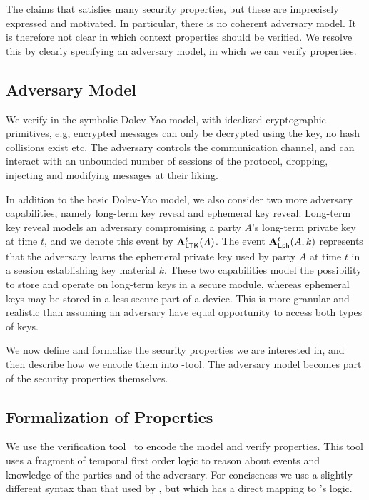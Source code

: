 The \mEdhoc{} \mSpec{} \cite{our-analysis-selander-lake-edhoc-00} claims
that \mEdhoc{} satisfies many security properties, but these are imprecisely
expressed and motivated.
%
In particular, there is no coherent adversary model.
%
It is therefore not clear in which context properties should be verified.
%
We resolve this by clearly specifying an adversary model, in which we can verify
properties.
%

%

\subsection{Adversary Model}\label{sec:threat-model}
We verify \mEdhoc{} in the symbolic Dolev-Yao model, with idealized
cryptographic primitives, e.g, encrypted messages can only be
decrypted using the key, no hash collisions exist etc.
%
The adversary controls the
communication channel, and can interact with an unbounded number of sessions
of the protocol, dropping, injecting and modifying messages at their liking.
%

In addition to the basic Dolev-Yao model, we also consider two more adversary
capabilities, namely long-term key reveal and ephemeral key reveal.
%
Long-term key reveal models an adversary compromising a party $A$'s
long-term private key  at time $t$, and we denote this event by
$\mathbf{A}_{\textsf{LTK}}^t(A)$.
%
The event $\mathbf{A}_{\textsf{Eph}}^t(A, k)$ represents that the adversary learns
the ephemeral private key  used by party $A$ at time $t$ in a session
establishing key material $k$.
%
These two capabilities model the possibility to store and operate on
long-term keys in a secure module, whereas ephemeral keys
may be stored in a less secure part of a device.
%
This is more granular and realistic than assuming an adversary have equal
opportunity to access both types of keys.
%

We now define and formalize the security properties we are interested in, and
then describe how we encode them into \mTamarin{}-tool.
%
The adversary model becomes part of the security properties themselves.
%

\subsection{Formalization of Properties}
\label{sec:desired-properties}
%
We use the \mTamarin{} verification
tool~\cite{DBLP:conf/cav/MeierSCB13} to encode the model and verify properties.
%
This tool uses a fragment of temporal first order logic to reason about
events and knowledge of the parties and of the adversary.
%
For conciseness we use a slightly different syntax than
that used by \mTamarin{}, but which has a direct mapping to \mTamarin{}'s logic.
%

